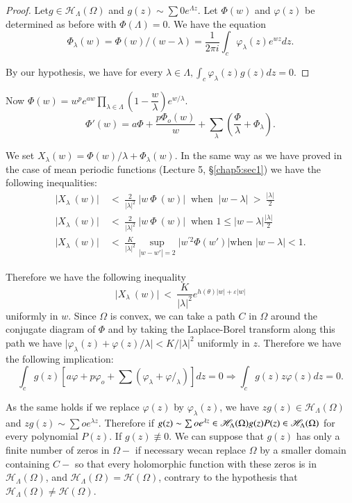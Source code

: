 \begin{proof}
 Let\pageoriginale $g \in \mathscr{H}_\Lambda (\Omega)$ and $g(z) \sim \sum 0
 e^{\Lambda z}$. Let $\Phi (w)$ and $\varphi (z)$ be determined as
 before with $\Phi (\Lambda) = 0$. We have the equation 
 $$
 \Phi_\lambda (w) = \Phi (w) / (w-\lambda) = \frac{1}{2 \pi i} \int_c
 \varphi_\lambda (z) e^{wz} dz. 
 $$

 By our hypothesis, we have for every $\lambda \in \Lambda, \int_c
 \varphi_\lambda (z) g(z) dz = 0$.
\end{proof}

 Now $\Phi (w) = w^p e^{aw} \prod\limits_{\lambda \in \Lambda} \left(1 -
 \dfrac{w}{\lambda}\right) e^{w/ \lambda}$. 
 $$
 \Phi' (w) = a \Phi + \frac{p \Phi_o (w)}{w} + \sum_\lambda
 \left(\frac{\Phi}{\lambda} + \Phi_\lambda\right). 
 $$

We set $X_\lambda (w) = \Phi (w) / \lambda + \Phi_\lambda (w)$. In the
same way as we have proved in the case of mean periodic functions
(Lecture 5, \S \ref{chap5:sec1}) we have the following inequalities: 
\begin{align*}
 \big|X_\lambda~ (w)\big|~ & < ~\frac{2}{\big|\lambda \big|^2}~
 \big|w~ \Phi~ (w)\big|~ \text{ when }~ \big|w - \lambda \big|~
 >~ \frac{\big|\lambda \big|}{2}\\ 
 \big|X_\lambda~ (w)\big|~ & < ~\frac{2}{\big|\lambda \big|^2}~
 \big|w~ \Phi~ (w)\big|~ \text{ when } 1 \le \big| w - \lambda \big|
 \frac{|\lambda|}{2}\\ 
 \big|X_\lambda~ (w)\big|~ & < ~\frac{K}{\big|\lambda \big|^2}
 \sup\limits_{ |w - w'| = 2 } \big| w^{'2} \Phi (w') \big| \text{
 when } \big|w - \lambda \big| < 1. 
\end{align*}

Therefore we have the following inequality
$$
\big|X_\lambda~ (w)\big|~ < ~\dfrac{K}{\big|\lambda \big|^2}
e^{h (\theta) \big| w \big| + \varepsilon \big| w \big|} 
$$
uniformly in $w$. Since $\Omega$ is convex, we can take a path $C$ in
$\Omega$ around the conjugate diagram of $\Phi$ and by taking the
Laplace-Borel transform along this path we have $\big| \varphi_\lambda
(z) + \varphi (z) / \lambda \big| < K/ \big| \lambda \big|^2$
uniformly in $z$. Therefore we have the following implication: 
$$
\int_c g(z) \left[ a \varphi + p \varphi_o + \sum (\varphi_\lambda +
 \varphi/_\lambda )\right] dz = 0 \Longrightarrow \int_c g(z) z \varphi (z)
dz =0. 
$$

As the same holds if we replace $\varphi (z)$ by $\varphi_\lambda
(z)$, we have $z g (z) \in \mathscr{H}_\Lambda (\Omega)$ and $zg (z)
\sim \sum o e^{\lambda z}$. Therefore if $g (z) \sim \sum oe^{\lambda
 z} \in \mathscr{H}_\Lambda (\Omega) g (z)\break P (z) \in \mathscr{H}_\Lambda
(\Omega)$ for every polynomial $P(z)$. If $g(z) \nequiv 0$. We can
suppose that $g (z)$ has only a finite number of zeros in $\Omega-$ if
necessary we\pageoriginale can replace $\Omega$ by a smaller domain containing $C-$
so that every holomorphic function with these zeros is in
$\mathscr{H}_\Lambda (\Omega)$, and $\mathscr{H}_\Lambda (\Omega) =
\mathscr{H} (\Omega)$, contrary to the hypothesis that
$\mathscr{H}_\Lambda (\Omega) \neq \mathscr{H}(\Omega)$. 

